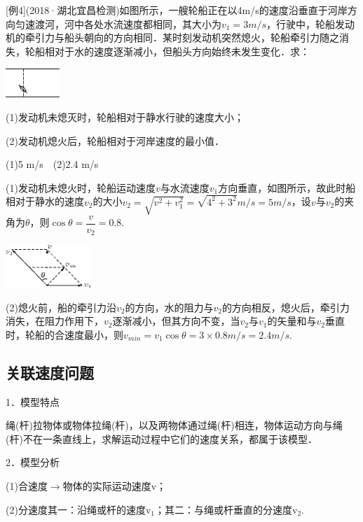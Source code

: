 {[}例4{]}(2018·湖北宜昌检测)如图所示，一艘轮船正在以4m/s的速度沿垂直于河岸方向匀速渡河，河中各处水流速度都相同，其大小为$v_1=3m/s$，行驶中，轮船发动机的牵引力与船头朝向的方向相同．某时刻发动机突然熄火，轮船牵引力随之消失，轮船相对于水的速度逐渐减小，但船头方向始终未发生变化．求：

\begin{center}\includegraphics[width=0.80208in,height=0.4375in]{media/image149.png}\end{center}

(1)发动机未熄灭时，轮船相对于静水行驶的速度大小；

(2)发动机熄火后，轮船相对于河岸速度的最小值．
\begin{solution}(1)5 m/s　(2)2.4 m/s

	(1)发动机未熄火时，轮船运动速度$v$与水流速度$v_1$方向垂直，如图所示，故此时船相对于静水的速度$v_2$的大小$v_2=\sqrt{v^2+v_1^2}=\sqrt{4^2+3^2} m/s=5 m/s$，设$v$与$v_2$的夹角为$\theta$，则$\cos \theta=\dfrac{v}{v_2} =0.8$.
\begin{center}\includegraphics[width=1.26042in,height=0.63542in]{media/image150.png}\end{center}

(2)熄火前，船的牵引力沿$v_2$的方向，水的阻力与$v_2$的方向相反，熄火后，牵引力消失，在阻力作用下，$v_2$逐渐减小，但其方向不变，当$v_2$与$v_1$的矢量和与$v_2$垂直时，轮船的合速度最小，则$v_{min}=v_1\cos\theta=3\times 0.8 m/s=2.4 m/s$.
\end{solution}


\newpage
\subsection{关联速度问题}

1．模型特点

绳(杆)拉物体或物体拉绳(杆)，以及两物体通过绳(杆)相连，物体运动方向与绳(杆)不在一条直线上，求解运动过程中它们的速度关系，都属于该模型．

2．模型分析

(1)合速度$\rightarrow$物体的实际运动速度v；

(2)分速度其一：沿绳或杆的速度$\mathrm v_1$；其二：与绳或杆垂直的分速度$\mathrm v_2$.

